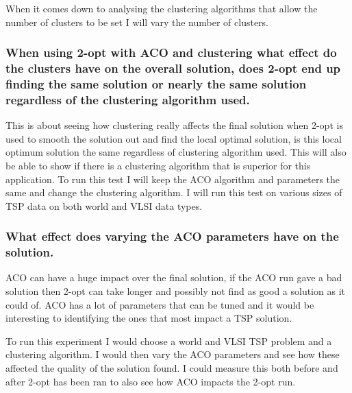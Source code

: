 When it comes down to analysing the clustering algorithms that allow the number of clusters to be set I will vary the number of clusters.

\subsubsection{When using 2-opt with ACO and clustering what effect do the clusters have on the overall solution, does 2-opt end up finding the same solution or nearly the same solution regardless of the clustering algorithm used.}

This is about seeing how clustering really affects the final solution when 2-opt is used to smooth the solution out and find the local optimal solution, is this local optimum solution the same regardless of clustering algorithm used. This will also be able to show if there is a clustering algorithm that is superior for this application. To run this test I will keep the ACO algorithm and parameters the same and change the clustering algorithm. I will run this test on various sizes of TSP data on both world and VLSI data types. 

\subsubsection{What effect does varying the ACO parameters have on the solution.}

ACO can have a huge impact over the final solution, if the ACO run gave a bad solution then 2-opt can take longer and possibly not find as good a solution as it could of. ACO has a lot of parameters that can be tuned and it would be interesting to identifying the ones that most impact a TSP solution.

To run this experiment I would choose a world and VLSI TSP problem and a clustering algorithm. I would then vary the ACO parameters and see how these affected the quality of the solution found. I could measure this both before and after 2-opt has been ran to also see how ACO impacts the 2-opt run.